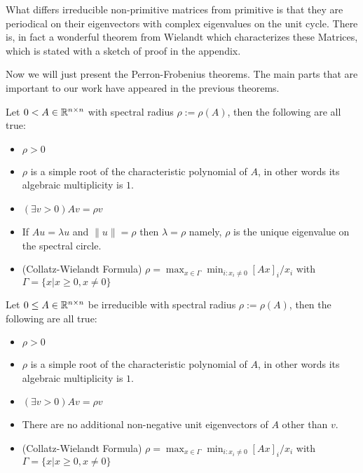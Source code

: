 What differs irreducible non-primitive matrices from primitive is
that they are periodical on their eigenvectors with complex eigenvalues
on the unit cycle. There is, in fact a wonderful theorem from Wielandt which
characterizes these Matrices, which is stated with a sketch of proof
in the appendix.

Now we will just present the Perron-Frobenius theorems. The main parts that are
important to our work have appeared in the previous theorems.

\begin{thm}
\label{thm:perron1}

Let $0 < A \in \mathbb{R}^{n \times n}$ with spectral radius $\rho := \rho(A)$, then the following are all true:
\begin{itemize}
\item{} $\rho \gt 0$
\item{} $\rho$ is a simple root of the characteristic polynomial of $A$,
in other words its algebraic multiplicity is $1$.
\item{} $(\exists v > 0) Av=\rho v$
\item{} If $Au = \lambda u$ and $\|u\|= \rho$ then $\lambda = \rho$
namely, $\rho$ is the unique eigenvalue on the spectral circle.
\item{(Collatz-Wielandt Formula)} $\rho = \max_{x \in \Gamma} \min_{i : x_i \neq 0} [Ax]_i / x_i$
with $\Gamma = \{x | x \geq 0, x \neq 0\}$
\end{itemize}
\end{thm}

\begin{thm}
\label{thm:perron2}

Let $0 \leq A \in \mathbb{R}^{n \times n}$ be irreducible with spectral radius $\rho := \rho(A)$,
then the following are all true:
\begin{itemize}
\item{} $\rho \gt 0$
\item{} $\rho$ is a simple root of the characteristic polynomial of $A$,
in other words its algebraic multiplicity is $1$.
\item{} $(\exists v > 0) Av=\rho v$
\item{} There are no additional non-negative unit eigenvectors of $A$ other than
$v$. 
\item{(Collatz-Wielandt Formula)} $\rho = \max_{x \in \Gamma} \min_{i : x_i \neq 0} [Ax]_i / x_i$
with $\Gamma = \{x | x \geq 0, x \neq 0\}$
\end{itemize}
\end{thm}
